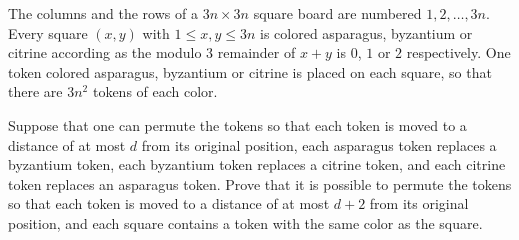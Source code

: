 The columns and the rows of a $3n \times 3n$ square board are numbered $1, 2, \ldots, 3n$. Every square $(x, y)$ with $1 \leq x, y \leq 3n$ is colored asparagus, byzantium or citrine according as the modulo $3$ remainder of $x + y$ is $0$, $1$ or $2$ respectively. One token colored asparagus, byzantium or citrine is placed on each square, so that there are $3n^2$ tokens of each color.

Suppose that one can permute the tokens so that each token is moved to a distance of at most $d$ from its original position, each asparagus token replaces a byzantium token, each byzantium token replaces a citrine token, and each citrine token replaces an asparagus token. Prove that it is possible to permute the tokens so that each token is moved to a distance of at most $d + 2$ from its original position, and each square contains a token with the same color as the square.
